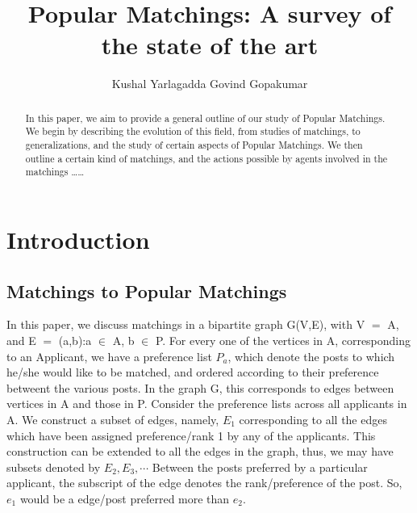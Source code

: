\documentclass{llncs}
\begin{document}
\title{Popular Matchings: A survey of the state of the art}



\author{Kushal Yarlagadda  Govind Gopakumar}







\maketitle

\begin{abstract}
In this paper, we aim to provide a general outline of our study of Popular Matchings. We begin by describing the evolution of this field, from studies of matchings, to generalizations, and the study of certain aspects of Popular Matchings. We then outline a certain kind of matchings, and the actions possible by agents involved in the matchings \ldots\ldots
\end{abstract}

\section{Introduction}
\subsection{Matchings to Popular Matchings}

In this paper, we discuss  matchings in a bipartite graph G(V,E), with V $=$ A\cupP, and E $=$ (a,b):\lbrace a $\in$ A, b $\in$ P\rbrace. 
For every one of the vertices in A, corresponding to an Applicant, we have a preference list $P_a$,
which denote the posts to which he/she would like to be matched, and ordered according to their preference betweent the various posts. In the graph G, this corresponds to edges between vertices in A and those in P. 
Consider the preference lists across all applicants in A. 
We construct a subset of edges, namely, $E_1$ corresponding to all the edges which have been assigned preference/rank 1 by any of the applicants. 
This construction can be extended to all the edges in the graph, thus, we may have subsets denoted by $E_2, E_3, \cdots$ 
Between the posts preferred by a particular applicant, the subscript of the edge denotes the rank/preference of the post. So, $e_1$ would be a edge/post preferred more than $e_2$.
\end{document}
